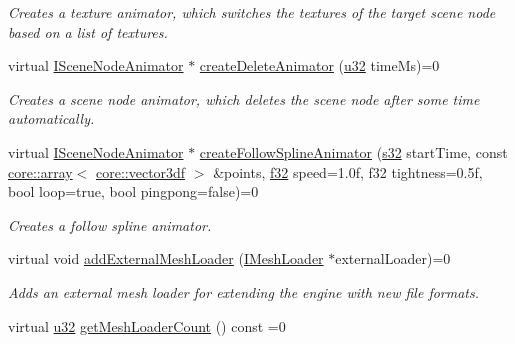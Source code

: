 \begin{DoxyCompactItemize}
\begin{DoxyCompactList}\small\item\em Creates a texture animator, which switches the textures of the target scene node based on a list of textures. \end{DoxyCompactList}\item 
virtual \hyperlink{classirr_1_1scene_1_1ISceneNodeAnimator}{I\+Scene\+Node\+Animator} $\ast$ \hyperlink{classirr_1_1scene_1_1ISceneManager_a163cc04ff2cb03852ac891de56200fa3}{create\+Delete\+Animator} (\hyperlink{namespaceirr_a0416a53257075833e7002efd0a18e804}{u32} time\+Ms)=0
\begin{DoxyCompactList}\small\item\em Creates a scene node animator, which deletes the scene node after some time automatically. \end{DoxyCompactList}\item 
virtual \hyperlink{classirr_1_1scene_1_1ISceneNodeAnimator}{I\+Scene\+Node\+Animator} $\ast$ \hyperlink{classirr_1_1scene_1_1ISceneManager_ab0c9d4ab88bbe2ad71623b1054a0c3ba}{create\+Follow\+Spline\+Animator} (\hyperlink{namespaceirr_ac66849b7a6ed16e30ebede579f9b47c6}{s32} start\+Time, const \hyperlink{classirr_1_1core_1_1array}{core\+::array}$<$ \hyperlink{namespaceirr_1_1core_a06f169d08b5c429f5575acb7edbad811}{core\+::vector3df} $>$ \&points, \hyperlink{namespaceirr_a0277be98d67dc26ff93b1a6a1d086b07}{f32} speed=1.\+0f, f32 tightness=0.\+5f, bool loop=true, bool pingpong=false)=0
\begin{DoxyCompactList}\small\item\em Creates a follow spline animator. \end{DoxyCompactList}\item 
virtual void \hyperlink{classirr_1_1scene_1_1ISceneManager_a808972cc001db86c0576c38b3b3fbbf7}{add\+External\+Mesh\+Loader} (\hyperlink{classirr_1_1scene_1_1IMeshLoader}{I\+Mesh\+Loader} $\ast$external\+Loader)=0
\begin{DoxyCompactList}\small\item\em Adds an external mesh loader for extending the engine with new file formats. \end{DoxyCompactList}\item 
virtual \hyperlink{namespaceirr_a0416a53257075833e7002efd0a18e804}{u32} \hyperlink{classirr_1_1scene_1_1ISceneManager_a78f1cb453aa87f3cbaa2fd9d1a2aa9a6}{get\+Mesh\+Loader\+Count} () const  =0\hypertarget{classirr_1_1scene_1_1ISceneManager_a78f1cb453aa87f3cbaa2fd9d1a2aa9a6}{}\label{classirr_1_1scene_1_1ISceneManager_a78f1cb453aa87f3cbaa2fd9d1a2aa9a6}


\end{DoxyCompactItemize}
